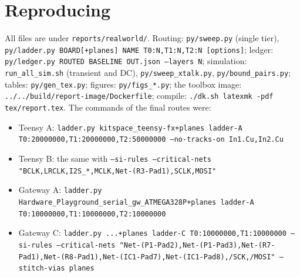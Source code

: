 \documentclass[10pt,a4paper]{article}
\newcommand{\file}[1]{\texttt{\small #1}}
\begin{document}
\section{Reproducing}\label{sec:repro}
All files are under \file{reports/realworld/}. Routing: \file{py/sweep.py} (single tier), \file{py/ladder.py BOARD[+planes] NAME T0:N,T1:N,T2:N [options]}; ledger: \file{py/ledger.py ROUTED BASELINE OUT.json --layers N};
simulation: \file{run\_all\_sim.sh} (transient and DC), \file{py/sweep\_xtalk.py}, \file{py/bound\_pairs.py}; tables: \file{py/gen\_tex.py}; figures: \file{py/figs\_*.py}; the toolbox image: \file{../../build/report-image/Dockerfile}; compile: \file{./dk.sh latexmk -pdf tex/report.tex}.
The commands of the final routes were:
\begin{itemize}\small
\item Teensy A: \texttt{ladder.py kitspace\_teensy-fx+planes ladder-A T0:20000000,T1:20000000,T2:50000000 --no-tracks-on In1.Cu,In2.Cu}
\item Teensy B: the same with \texttt{--si-rules --critical-nets "BCLK,LRCLK,I2S\_*,MCLK,Net-(R3-Pad1),SCLK,MOSI"}
\item Gateway A: \texttt{ladder.py Hardware\_Playground\_serial\_gw\_ATMEGA328P+planes ladder-A T0:10000000,T1:10000000,T2:10000000}
\item Gateway C: \texttt{ladder.py ...+planes ladder-C T0:10000000,T1:10000000 --si-rules --critical-nets "Net-(P1-Pad2),Net-(P1-Pad3),Net-(R7-Pad1),Net-(R8-Pad1),Net-(IC1-Pad7),Net-(IC1-Pad8),/SCK,/MOSI" --stitch-vias planes}
\end{itemize}
\end{document}
